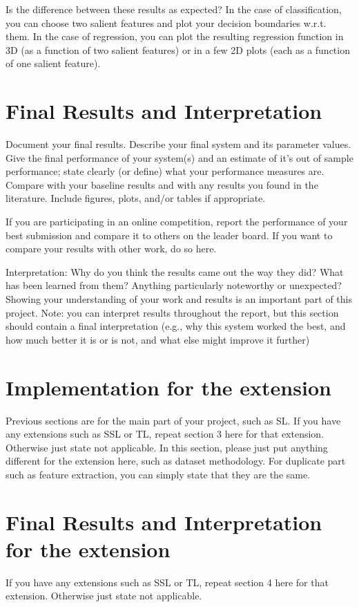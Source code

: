 \documentclass[singlecolumn]{article}
\begin{document}
Is the difference between these results as expected? In the case of classification, you can choose two salient features and plot your decision boundaries w.r.t. them.  In the case of regression, you can plot the resulting regression function in 3D (as a function of two salient features) or in a few 2D plots (each as a function of one salient feature). 


\section{Final Results and Interpretation}\label{sec-interpretation}
Document your final results. Describe your final system and its parameter values.  Give the final performance of your system(s) and an estimate of it's out of sample performance; state clearly (or define) what your performance measures are. Compare with your baseline results and with any results you found in the literature. Include figures, plots, and/or tables if appropriate.  

If you are participating in an online competition, report the performance of your best submission and compare it to others on the leader board.  If you want to compare your results with other work, do so here.

Interpretation:  Why do you think the results came out the way they did?  What has been learned from them?  Anything particularly noteworthy or unexpected?  Showing your understanding of your work and results is an important part of this project. Note: you can interpret results throughout the report, but this section should contain a final interpretation (e.g., why this system worked the best, and how much better it is or is not, and what else might improve it further)

\section{Implementation for the extension}
Previous sections are for the main part of your project, such as SL. If you have any extensions such as SSL or TL, repeat section 3 here for that extension. Otherwise just state not applicable. In this section, please just put anything different for the extension here, such as dataset methodology. For duplicate part such as feature extraction, you can simply state that they are the same.

\section{Final Results and Interpretation for the extension}
If you have any extensions such as SSL or TL, repeat section 4 here for that extension. Otherwise just state not applicable.
\end{document}
